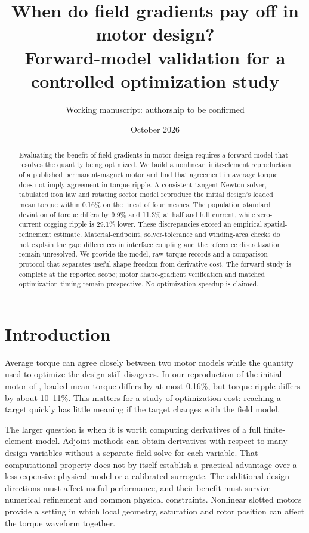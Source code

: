 \documentclass{anvil-paper}
\title{When do field gradients pay off in motor design?\\
Forward-model validation for a controlled optimization study}
\author{Working manuscript: authorship to be confirmed}
\date{October 2026}
\begin{document}
\maketitle
\begin{abstract}
Evaluating the benefit of field gradients in motor design requires a forward
model that resolves the quantity being optimized. We build a nonlinear
finite-element reproduction of a published permanent-magnet motor and find
that agreement in average torque does not imply agreement in torque ripple.
A consistent-tangent Newton solver, tabulated iron law and rotating sector
model reproduce the initial design's loaded mean torque within 0.16\% on
the finest of four meshes. The population standard deviation of torque
differs by 9.9\% and 11.3\% at half and full current, while zero-current
cogging ripple is 29.1\% lower. These discrepancies exceed an empirical
spatial-refinement estimate. Material-endpoint, solver-tolerance and
winding-area checks do not explain the gap; differences in interface
coupling and the reference discretization remain unresolved. We provide
the model, raw torque records and a comparison protocol that separates
useful shape freedom from derivative cost. The forward study is complete
at the reported scope; motor shape-gradient verification and matched
optimization timing remain prospective. No optimization speedup is claimed.
\end{abstract}

\section{Introduction}
Average torque can agree closely between two motor models while the
quantity used to optimize the design still disagrees. In our reproduction
of the initial motor of \citet{wiesheu2024spline}, loaded mean torque differs
by at most 0.16\%, but torque ripple differs by about 10--11\%. This matters
for a study of optimization cost: reaching a target quickly has little
meaning if the target changes with the field model.

The larger question is when it is worth computing derivatives of a full
finite-element model. Adjoint methods can obtain derivatives with respect
to many design variables without a separate field solve for each variable.
That computational property does not by itself establish a practical
advantage over a less expensive physical model or a calibrated surrogate.
The additional design directions must affect useful performance, and their
benefit must survive numerical refinement and common physical constraints.
Nonlinear slotted motors provide a setting in which local geometry,
saturation and rotor position can affect the torque waveform together.
\end{document}
